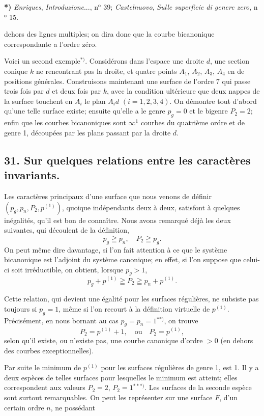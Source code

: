 \documentclass{article}
\begin{document}
\textbf{*)} \emph{Enriques}, \emph{Introduzione}..., n${}^{\text{o}}$ 39; \emph{Castelnuovo}, \emph{Sulle superficie di genere zero}, n${}^{\text{o}}$ 15.

dehors des lignes multiples; on dira donc que la courbe bicanonique correspondante a l'ordre zéro.

Voici un second exemple${}^{*)}$. Considérons dans l'espace une droite $d$, une section conique $k$ ne rencontrant pas la droite, et quatre points $A_{1}$, $A_{2}$, $A_{3}$, $A_{4}$ en de positions générales. Construisons maintenant une surface de l'ordre 7 qui passe trois fois par $d$ et deux fois par $k$, avec la condition ultérieure que deux nappes de la surface touchent en $A_{i}$ le plan $A_{i}d$ $(i = 1, 2, 3, 4)$. On démontre tout d'abord qu'une telle surface existe; ensuite qu'elle a le genre $p_{g} = 0$ et le bigenre $P_{2} = 2$; enfin que les courbes bicanoniques sont $\infty^{1}$ courbes du quatrième ordre et de genre 1, découpées par les plans passant par la droite $d$.

\subsection*{31. Sur quelques relations entre les caractères invariants.}

Les caractères principaux d'une surface que nous venons de définir $(p_{g}, p_{n}, P_{2}, p^{(1)})$, quoique indépendants deux à deux, satisfont à quelques inégalités, qu'il est bon de connaître. Nous avons remarqué déjà les deux suivantes, qui découlent de la définition,
\[ p_{g} \geqq p_{n}, \quad P_{2} \geqq p_{g}. \]
On peut même dire davantage, si l'on fait attention à ce que le système bicanonique est l'adjoint du système canonique; en effet, si l'on suppose que celui-ci soit irréductible, on obtient, lorsque $p_{g} > 1$,
\[ p_{g} + p^{(1)} \geqq P_{2} \geqq p_{n} + p^{(1)}. \]

Cette relation, qui devient une égalité pour les surfaces régulières, ne subsiste pas toujours si $p_{g} = 1$, même si l'on recourt à la définition virtuelle de $p^{(1)}$. Précisément, en nous bornant au cas $p_{g} = p_{n} = 1$${}^{**)}$, on trouve
\[ P_{2} = p^{(1)} + 1, \quad \text{ou} \quad P_{2} = p^{(1)}, \]
selon qu'il existe, ou n'existe pas, une courbe canonique d'ordre $> 0$ (en dehors des courbes exceptionnelles).

Par suite le minimum de $p^{(1)}$ pour les surfaces régulières de genre 1, est 1. Il y a deux espèces de telles surfaces pour lesquelles le minimum est atteint; elles correspondent aux valeurs $P_{2} = 2$, $P_{2} = 1$${}^{***)}$. Les surfaces de la seconde espèce sont surtout remarquables. On peut les représenter sur une surface $F$, d'un certain ordre $n$, ne possédant
\end{document}
